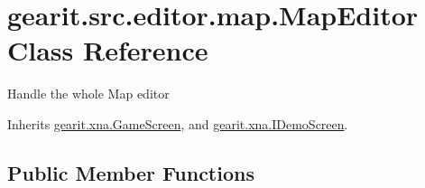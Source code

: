\hypertarget{classgearit_1_1src_1_1editor_1_1map_1_1_map_editor}{\section{gearit.\+src.\+editor.\+map.\+Map\+Editor Class Reference}
\label{classgearit_1_1src_1_1editor_1_1map_1_1_map_editor}
}


Handle the whole Map editor  




Inherits \hyperlink{classgearit_1_1xna_1_1_game_screen}{gearit.\+xna.\+Game\+Screen}, and \hyperlink{interfacegearit_1_1xna_1_1_i_demo_screen}{gearit.\+xna.\+I\+Demo\+Screen}.

\subsection*{Public Member Functions}
